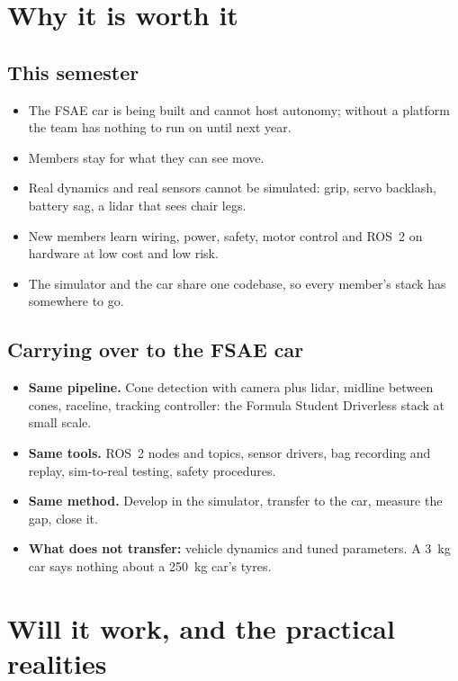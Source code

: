 \documentclass[11pt,a4paper]{article}
\begin{document}
\section{Why it is worth it}

\subsection*{This semester}
\begin{itemize}
  \item The FSAE car is being built and cannot host autonomy; without a platform the team has nothing to run on until next year.
  \item Members stay for what they can see move.
  \item Real dynamics and real sensors cannot be simulated: grip, servo backlash, battery sag, a lidar that sees chair legs.
  \item New members learn wiring, power, safety, motor control and ROS~2 on hardware at low cost and low risk.
  \item The simulator and the car share one codebase, so every member's stack has somewhere to go.
\end{itemize}

\subsection*{Carrying over to the FSAE car}
\begin{itemize}
  \item \textbf{Same pipeline.} Cone detection with camera plus lidar, midline between cones, raceline, tracking controller: the Formula Student Driverless stack at small scale.
  \item \textbf{Same tools.} ROS~2 nodes and topics, sensor drivers, bag recording and replay, sim-to-real testing, safety procedures.
  \item \textbf{Same method.} Develop in the simulator, transfer to the car, measure the gap, close it.
  \item \textbf{What does not transfer:} vehicle dynamics and tuned parameters. A 3~kg car says nothing about a 250~kg car's tyres.
\end{itemize}

\section{Will it work, and the practical realities}
\end{document}
